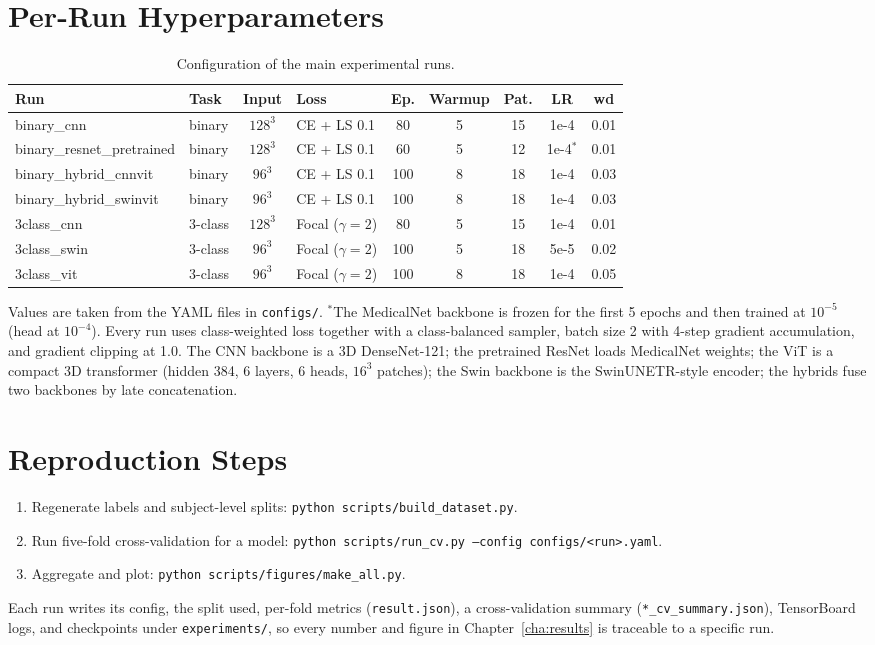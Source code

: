 \section*{Per-Run Hyperparameters}
\begin{table}[H]
\centering
\caption{Configuration of the main experimental runs.}
\begin{tabular}{|l|l|c|l|c|c|c|c|c|}
\hline
\textbf{Run} & \textbf{Task} & \textbf{Input} & \textbf{Loss} & \textbf{Ep.} & \textbf{Warmup} & \textbf{Pat.} & \textbf{LR} & \textbf{wd} \\
\hline
binary\_cnn & binary & $128^3$ & CE + LS 0.1 & 80 & 5 & 15 & 1e-4 & 0.01 \\
binary\_resnet\_pretrained & binary & $128^3$ & CE + LS 0.1 & 60 & 5 & 12 & 1e-4$^{*}$ & 0.01 \\
binary\_hybrid\_cnnvit & binary & $96^3$ & CE + LS 0.1 & 100 & 8 & 18 & 1e-4 & 0.03 \\
binary\_hybrid\_swinvit & binary & $96^3$ & CE + LS 0.1 & 100 & 8 & 18 & 1e-4 & 0.03 \\
3class\_cnn & 3-class & $128^3$ & Focal ($\gamma{=}2$) & 80 & 5 & 15 & 1e-4 & 0.01 \\
3class\_swin & 3-class & $96^3$ & Focal ($\gamma{=}2$) & 100 & 5 & 18 & 5e-5 & 0.02 \\
3class\_vit & 3-class & $96^3$ & Focal ($\gamma{=}2$) & 100 & 8 & 18 & 1e-4 & 0.05 \\
\hline
\end{tabular}
\end{table}
Values are taken from the YAML files in \texttt{configs/}. $^{*}$The MedicalNet backbone is frozen for the first 5 epochs and then trained at $10^{-5}$ (head at $10^{-4}$). Every run uses class-weighted loss together with a class-balanced sampler, batch size 2 with 4-step gradient accumulation, and gradient clipping at 1.0. The CNN backbone is a 3D DenseNet-121; the pretrained ResNet loads MedicalNet weights; the ViT is a compact 3D transformer (hidden 384, 6 layers, 6 heads, $16^3$ patches); the Swin backbone is the SwinUNETR-style encoder; the hybrids fuse two backbones by late concatenation.

\section*{Reproduction Steps}
\begin{enumerate}
    \item Regenerate labels and subject-level splits: \texttt{python scripts/build\_dataset.py}.
    \item Run five-fold cross-validation for a model: \texttt{python scripts/run\_cv.py --config configs/<run>.yaml}.
    \item Aggregate and plot: \texttt{python scripts/figures/make\_all.py}.
\end{enumerate}
Each run writes its config, the split used, per-fold metrics (\texttt{result.json}), a cross-validation summary (\texttt{*\_cv\_summary.json}), TensorBoard logs, and checkpoints under \texttt{experiments/}, so every number and figure in Chapter~\ref{cha:results} is traceable to a specific run.

